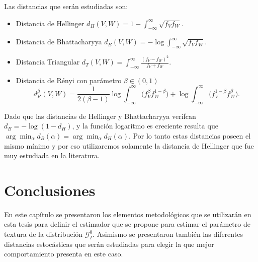 %
%
%

Las distancias que serán estudiadas son:

\begin{itemize}
	\item Distancia de Hellinger $d_H(V,W)=1-\int_{-\infty}^{\infty}\sqrt{f_Vf_W}$.
	
	\item Distancia de Bhattacharyya $d_B(V,W)=-\log\int_{-\infty}^{\infty}\sqrt{f_Vf_W}$.
	
	\item Distancia Triangular $d_T(V,W)=\int_{-\infty}^{\infty}\frac{(f_V-f_W)^2}{f_V+f_W}$.
	
	\item Distancia de R\'enyi con parámetro $\beta\in(0,1)$
	$$
	d_R^{\beta}(V,W)=\frac{1}{2(\beta-1)}\log\int_{-\infty}^{\infty}\big({f_V^{\beta}f_W^{1-\beta})+\log\int_{-\infty}^{\infty}\big(f_V^{1-\beta}f_W^{\beta}}\big).
	$$
\end{itemize}

Dado que las distancias de Hellinger y Bhattacharyya verifcan $d_B=-\log(1-d_H)$, y la función logaritmo es creciente resulta que $\arg\min_\alpha d_B(\alpha )=\arg\min_ \alpha d_H(\alpha )$. Por lo tanto estas distancias poseen el mismo mínimo y por eso utilizaremos solamente la distancia de Hellinger que fue muy estudiada en la literatura.

\section{Conclusiones}

En este capítulo se presentaron los elementos metodológicos que se utilizarán en esta tesis para definir el estimador que se propone para estimar el parámetro de textura de la distribución $\mathcal{G}_I^0$. Asimismo se presentaron también las diferentes distancias estocásticas que serán estudiadas para elegir la que mejor comportamiento presenta en este caso.